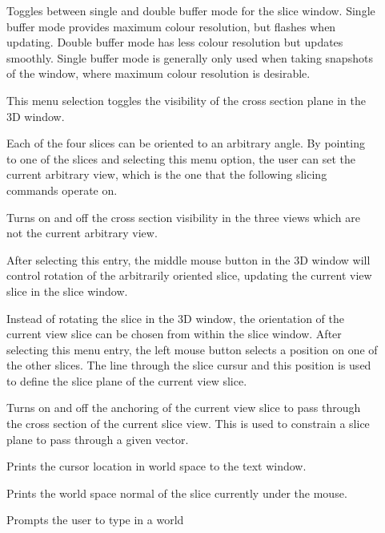\begin{description}
\item[]  Toggles between single and double buffer
       mode for the slice window.  Single buffer mode provides maximum
       colour resolution, but flashes when updating.  Double buffer
       mode has less colour resolution but updates smoothly.  Single
       buffer mode is generally only used when taking snapshots of the
       window, where maximum colour resolution is desirable.
\item[]  
       This menu
       selection toggles the visibility of the cross section plane in
       the 3D window.
\item[]  Each of the four slices can
       be oriented to an arbitrary angle.  By pointing to one of the slices
       and selecting this menu option, the user can set the current arbitrary
       view,
       which is the one that the following slicing commands operate on.
\item[]  Turns on and off the cross
       section visibility in the three views which are not the current
       arbitrary view.
\item[]  After selecting this entry,
       the middle mouse button in the 3D window will control rotation
       of the arbitrarily oriented slice, updating the current
       view slice in the slice window.
\item[]  Instead of rotating the
       slice in the 3D window, the orientation of the current view slice
       can be chosen from within the slice window.  After
       selecting this menu entry, the left
       mouse button selects a position on one of the other slices.  The
       line through the slice cursur and this position is used to define
       the slice plane of the current view slice.
\item[]  Turns on and off the anchoring
       of the current view slice to pass through the cross section of the
       current slice view.  This is used to constrain a slice plane to pass
       through a given vector.
\item[]  Prints the cursor location in world
       space to the text window.
\item[]  Prints the world space normal of
       the slice currently under the mouse.
\item[]  Prompts the user to type in a world

\end{description}
